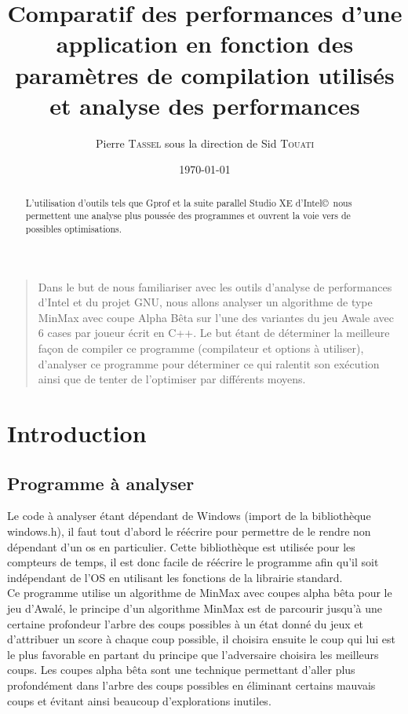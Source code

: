 \documentclass[
 aip,
 jmp,
 amsmath,amssymb,
 reprint
]{revtex4-1}
\begin{document}
\title{Comparatif des performances d'une application en fonction des paramètres de compilation utilisés et analyse des performances}

\author{Pierre \textsc{Tassel} sous la direction de Sid \textsc{Touati}}

\date{\today}

\begin{abstract}
L'utilisation d'outils tels que Gprof et la suite parallel Studio XE d'Intel\copyright \, nous permettent une analyse plus poussée des programmes et ouvrent la voie vers de possibles optimisations.
\end{abstract}

\maketitle

\begin{quotation}
Dans le but de nous familiariser avec les outils d'analyse de performances d'Intel et du projet GNU, nous allons analyser un algorithme de type MinMax avec coupe Alpha Bêta sur l'une des variantes du jeu Awale avec 6 cases par joueur écrit en C++. Le but étant de déterminer la meilleure façon de compiler ce programme (compilateur et options à utiliser), d'analyser ce programme pour déterminer ce qui ralentit son exécution ainsi que de tenter de l'optimiser par différents moyens.
\end{quotation}

\vspace{-5mm}

\section{Introduction}
\subsection{Programme à analyser}
Le code à analyser étant dépendant de Windows (import de la bibliothèque windows.h), il faut tout d'abord le réécrire pour permettre de le rendre non dépendant d'un os en particulier. Cette bibliothèque est utilisée pour les compteurs de temps, il est donc facile de réécrire le programme afin qu'il soit indépendant de l'OS en utilisant les fonctions de la librairie standard.\\
Ce programme utilise un algorithme de MinMax avec coupes alpha bêta pour le jeu d'Awalé, le principe d'un algorithme MinMax est de parcourir jusqu'à une certaine profondeur l'arbre des coups possibles à un état donné du jeux et d'attribuer un score à chaque coup possible, il choisira ensuite le coup qui lui est le plus favorable en partant du principe que l'adversaire choisira les meilleurs coups. Les coupes alpha bêta sont une technique permettant d'aller plus profondément dans l'arbre des coups possibles en éliminant certains mauvais coups et évitant ainsi beaucoup d'explorations inutiles.
\end{document}
